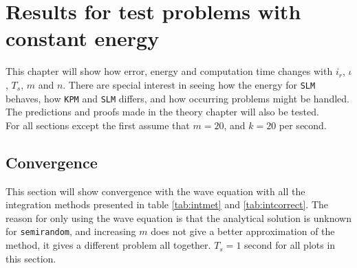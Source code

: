 \chapter{Results for test problems with constant energy}%
\label{sec:constres}
This chapter will show how error, energy and computation time changes with $i_r$, $\iota$, $T_s$, $m$ and $n$. There are special interest in seeing how the energy for \texttt{SLM} behaves, how \texttt{KPM} and \texttt{SLM} differs, and how occurring problems might be handled. The predictions and proofs made in the theory chapter will also be tested. \\

For all sections except the first assume that $m=20$, and $k = 20$ per second. 
\section{Convergence}%
This section will show convergence with the wave equation with all the integration methods presented in table \ref{tab:intmet} and \ref{tab:intcorrect}. The reason for only using the wave equation is that the analytical solution is unknown for \texttt{semirandom}, and increasing $m$ does not give a better approximation of the method, it gives a different problem all together. $T_s = 1$ second for all plots in this section.
